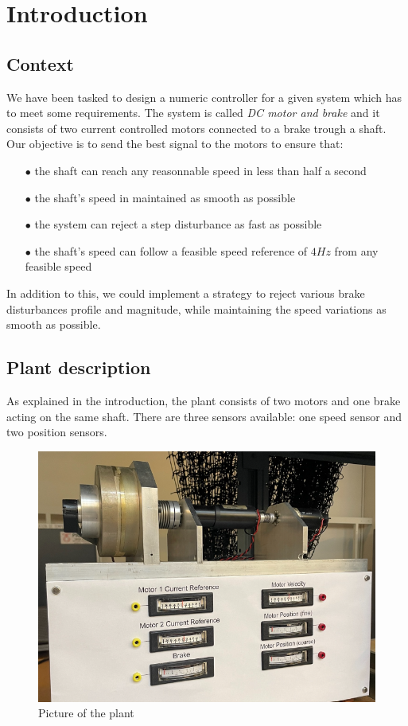 \setcounter{secnumdepth}{-1}

\chapter{Introduction}

\section{Context}

We have been tasked to design a numeric controller for a given system which has to meet some requirements. The system is 
called \textit{DC motor and brake} and it consists of two current controlled motors connected to a brake trough a shaft. \\

Our objective is to send the best signal to the motors to ensure that:

\begin{enumerate}
    \item[$\bullet$] the shaft can reach any reasonnable speed in less than half a second
    \item[$\bullet$] the shaft's speed in maintained as smooth as possible
    \item[$\bullet$] the system can reject a step disturbance as fast as possible
    \item[$\bullet$] the shaft's speed can follow a feasible speed reference of $4 Hz$ from any feasible speed
\end{enumerate}

In addition to this, we could implement a strategy to reject various brake disturbances profile and magnitude, while 
maintaining the speed variations as smooth as possible.

\section{Plant description}

As explained in the introduction, the plant consists of two motors and one brake acting on the same shaft. There are 
three sensors available: one speed sensor and two position sensors.

\begin{figure}[H]
    \centering
    \includegraphics[height=\textheight/5]{Pictures/plant_picture.png}
    \caption{Picture of the plant}
\end{figure}

